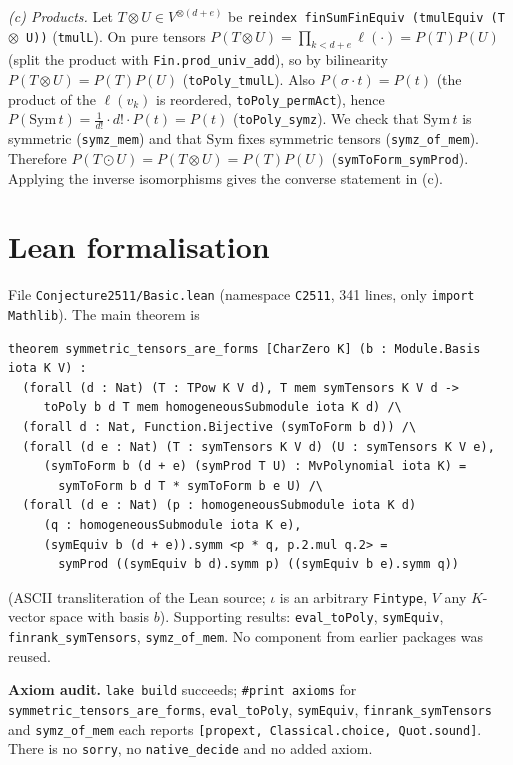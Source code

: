 \documentclass[11pt]{article}
\theoremstyle{definition}
\newcommand{\lean}[1]{\texttt{#1}}
\begin{document}
\emph{(c) Products.} Let $T\otimes U\in V^{\otimes(d+e)}$ be
\lean{reindex finSumFinEquiv (tmulEquiv (T $\otimes$ U))} (\lean{tmulL}). On pure tensors
$P(T\otimes U)=\prod_{k<d+e}\ell(\cdot)=P(T)P(U)$ (split the product with \lean{Fin.prod\_univ\_add}),
so by bilinearity $P(T\otimes U)=P(T)P(U)$ (\lean{toPoly\_tmulL}). Also $P(\sigma\cdot t)=P(t)$
(the product of the $\ell(v_k)$ is reordered, \lean{toPoly\_permAct}), hence $P(\mathrm{Sym}\,t)=
\frac1{d!}\cdot d!\cdot P(t)=P(t)$ (\lean{toPoly\_symz}). We check that $\mathrm{Sym}\,t$ is symmetric
(\lean{symz\_mem}) and that $\mathrm{Sym}$ fixes symmetric tensors (\lean{symz\_of\_mem}). Therefore
$P(T\odot U)=P(T\otimes U)=P(T)P(U)$ (\lean{symToForm\_symProd}). Applying the inverse isomorphisms
gives the converse statement in (c).

\section{Lean formalisation}

File \lean{Conjecture2511/Basic.lean} (namespace \lean{C2511}, 341 lines, only
\lean{import Mathlib}). The main theorem is
\begin{verbatim}
theorem symmetric_tensors_are_forms [CharZero K] (b : Module.Basis iota K V) :
  (forall (d : Nat) (T : TPow K V d), T mem symTensors K V d ->
     toPoly b d T mem homogeneousSubmodule iota K d) /\
  (forall d : Nat, Function.Bijective (symToForm b d)) /\
  (forall (d e : Nat) (T : symTensors K V d) (U : symTensors K V e),
     (symToForm b (d + e) (symProd T U) : MvPolynomial iota K) =
       symToForm b d T * symToForm b e U) /\
  (forall (d e : Nat) (p : homogeneousSubmodule iota K d)
     (q : homogeneousSubmodule iota K e),
     (symEquiv b (d + e)).symm <p * q, p.2.mul q.2> =
       symProd ((symEquiv b d).symm p) ((symEquiv b e).symm q))
\end{verbatim}
(ASCII transliteration of the Lean source; $\iota$ is an arbitrary \lean{Fintype}, $V$ any $K$-vector space with basis $b$). Supporting
results: \lean{eval\_toPoly}, \lean{symEquiv}, \lean{finrank\_symTensors}, \lean{symz\_of\_mem}.
No component from earlier packages was reused.

\textbf{Axiom audit.} \lean{lake build} succeeds; \lean{\#print axioms} for
\lean{symmetric\_tensors\_are\_forms}, \lean{eval\_toPoly}, \lean{symEquiv},
\lean{finrank\_symTensors} and \lean{symz\_of\_mem} each reports
\lean{[propext, Classical.choice, Quot.sound]}. There is no \lean{sorry}, no \lean{native\_decide}
and no added axiom.
\end{document}
